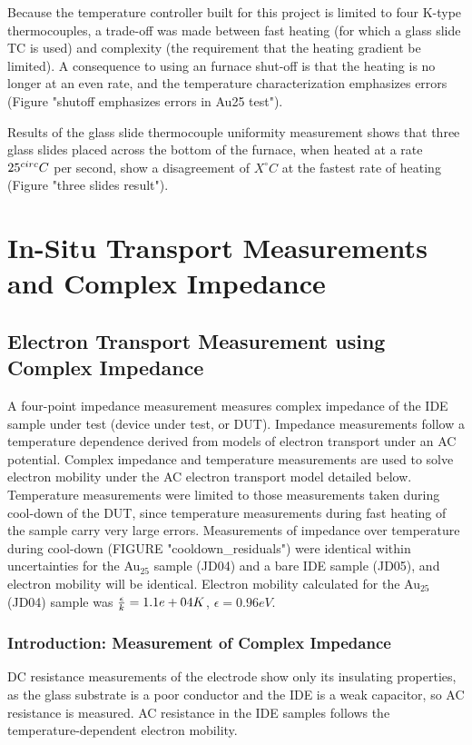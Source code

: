 \documentclass[12pt,oneside,english]{article}
\begin{document}
	Because the temperature controller built for this project is limited to four K-type thermocouples, a trade-off was made between fast heating (for which a glass slide TC is used) and complexity (the requirement that the heating gradient be limited). 
	A consequence to using an furnace shut-off is that the heating is no longer at an even rate, and the temperature characterization emphasizes errors (Figure "shutoff emphasizes errors in Au25 test").

	Results of the glass slide thermocouple uniformity measurement shows that three glass slides placed across the bottom of the furnace, when heated at a rate $25^{\/circ}C$ per second, show a disagreement of $X^{\circ}C$ at the fastest rate of heating (Figure "three slides result").

	\clearpage
	
	\section{In-Situ Transport Measurements and Complex Impedance}

	\subsection{Electron Transport Measurement using Complex Impedance}
	A four-point impedance measurement measures complex impedance of the IDE sample under test (device under test, or DUT).  
	Impedance measurements follow a temperature dependence derived from models of electron transport under an AC potential.  
	Complex impedance and temperature measurements are used to solve electron mobility under the AC electron transport model detailed below.  
	Temperature measurements were limited to those measurements taken during cool-down of the DUT, since temperature measurements during fast heating of the sample carry very large errors.  
	Measurements of impedance over temperature during cool-down (FIGURE "cooldown\_residuals") were identical within uncertainties for the Au$_25$ sample (JD04) and a bare IDE sample (JD05), and electron mobility will be identical.  
	Electron mobility calculated for the Au$_25$ (JD04) sample was ${\epsilon\over{k}} = 1.1e+04 K$, $\epsilon = 0.96 eV$.
		
	\subsubsection{Introduction: Measurement of Complex Impedance} 
	DC resistance measurements of the electrode show only its insulating properties, as the glass substrate is a poor conductor and the IDE is a weak capacitor, so AC resistance is measured.
	AC resistance in the IDE samples follows the temperature-dependent electron mobility.
	
\end{document}
